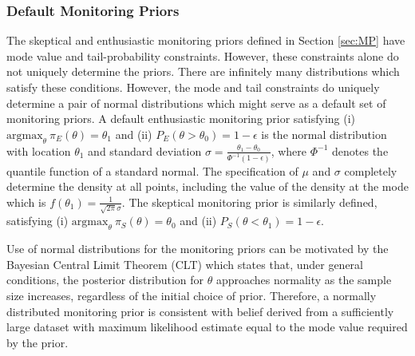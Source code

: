 \documentclass[12pt]{article}
\begin{document}
\subsubsection{Default Monitoring Priors}
The skeptical and enthusiastic monitoring priors defined in Section \ref{sec:MP} have mode value and tail-probability constraints. 
%
However, these constraints alone do not uniquely determine the priors.
%
There are infinitely many distributions which satisfy these conditions.
%
However, the mode and tail constraints do uniquely determine a pair of normal distributions which might serve as a default set of monitoring priors. 
%
%
A default enthusiastic monitoring prior satisfying (i) $\text{argmax}_\theta~\pi_E(\theta)=\theta_1$
and (ii) $P_E(\theta > \theta_0)=1-\epsilon$ is the normal distribution with location $\theta_1$ and standard deviation $\sigma=\frac{\theta_1-\theta_0}{\Phi^{-1}(1-\epsilon)}$, where $\Phi^{-1}$ denotes the quantile function of a standard normal.
%
The specification of $\mu$ and $\sigma$ completely determine the density at all points, including the value of the density at the mode which is $f(\theta_1)=\frac{1}{\sqrt{2\pi}\sigma}$.
%
The skeptical monitoring prior is similarly defined, satisfying (i) $\text{argmax}_\theta~\pi_S(\theta)=\theta_0$ and (ii) $P_S(\theta < \theta_1)=1-\epsilon$.

Use of normal distributions for the monitoring priors can be motivated by the Bayesian Central Limit Theorem (CLT) \citep{LeCam2000} which states that, under general conditions, the posterior distribution for $\theta$ approaches normality as the sample size increases, regardless of the initial choice of prior.
%
Therefore, a normally distributed monitoring prior is consistent with belief derived from a sufficiently large dataset with maximum likelihood estimate equal to the mode value required by the prior.
\end{document}
